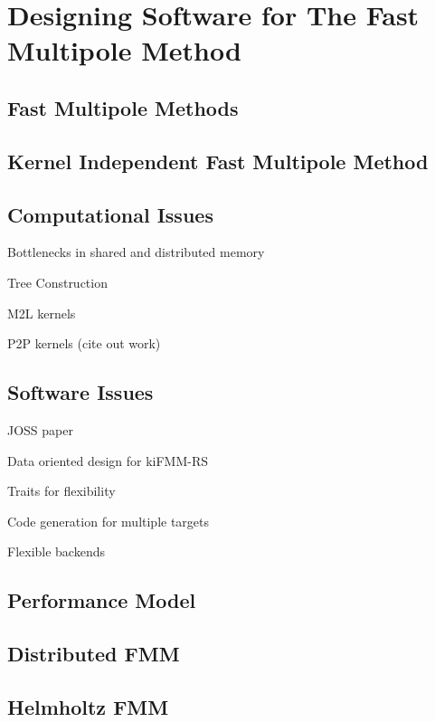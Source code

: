 \chapter{Designing Software for The Fast Multipole Method}\label{chpt:designing_software_for_fmm}
\thispagestyle{chaptertitle} %

\section{Fast Multipole Methods}

\section{Kernel Independent Fast Multipole Method}

\section{Computational Issues}

Bottlenecks in shared and distributed memory

Tree Construction

M2L kernels

P2P kernels (cite out work)


\section{Software Issues}

JOSS paper

Data oriented design for kiFMM-RS

Traits for flexibility

Code generation for multiple targets

Flexible backends

\section{Performance Model}



\section{Distributed FMM}

\section{Helmholtz FMM}


% 
% 
% 
% 